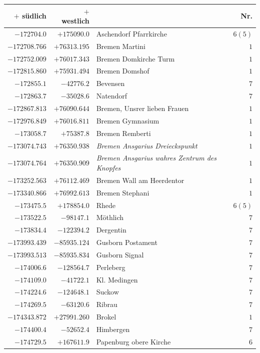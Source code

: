 \clearpage
\begin{center}\begingroup\fontsize{8}{9}\selectfont
\setlength{\tabcolsep}{4pt}
\begin{tabular}{r|r|p{170pt}|r}\hline
\(+\) südlich&\(+\) westlich&&Nr.\\\hline
\(-172704.0\)&\(+175090.0\)&Aschendorf Pfarrkirche&\(6 (5)\)\\
\(-172708.766\)&\(+76313.195\)&Bremen Martini&\(1\)\\
\(-172752.009\)&\(+76017.343\)&Bremen Domkirche Turm&\(1\)\\
\(-172815.860\)&\(+75931.494\)&Bremen Domshof&\(1\)\\
\(-172855.1\)&\(-42776.2\)&Bevensen&\(7\)\\
\(-172863.7\)&\(-35028.6\)&Natendorf&\(7\)\\
\(-172867.813\)&\(+76090.644\)&Bremen, Unsrer lieben Frauen&\(1\)\\
\(-172976.849\)&\(+76016.811\)&Bremen Gymnasium&\(1\)\\
\(-173058.7\)&\(+75387.8\)&Bremen Remberti&\(1\)\\
\(-173074.743\)&\(+76350.938\)&\textit{Bremen Ansgarius Dreieckspunkt}&\(1\)\\
\(-173074.764\)&\(+76350.909\)&\textit{Bremen Ansgarius wahres Zentrum des Knopfes}&\(1\)\\
\(-173252.563\)&\(+76112.469\)&Bremen Wall am Heerdentor&\(1\)\\
\(-173340.866\)&\(+76992.613\)&Bremen Stephani&\(1\)\\
\(-173475.5\)&\(+178854.0\)&Rhede&\(6 (5)\)\\
\(-173522.5\)&\(-98147.1\)&Möthlich&\(7\)\\
\(-173834.4\)&\(-122394.2\)&Dergentin&\(7\)\\
\(-173993.439\)&\(-85935.124\)&Gusborn Postament&\(7\)\\
\(-173993.513\)&\(-85935.834\)&Gusborn Signal&\(7\)\\
\(-174006.6\)&\(-128564.7\)&Perleberg&\(7\)\\
\(-174109.0\)&\(-41722.1\)&Kl. Medingen&\(7\)\\
\(-174224.6\)&\(-124648.1\)&Suckow&\(7\)\\
\(-174269.5\)&\(-63120.6\)&Ribrau&\(7\)\\
\(-174343.872\)&\(+27991.260\)&Brokel&\(1\)\\
\(-174400.4\)&\(-52652.4\)&Himbergen&\(7\)\\
\(-174729.5\)&\(+167611.9\)&Papenburg obere Kirche&\(6\)\\

\end{tabular}
\end{center}
